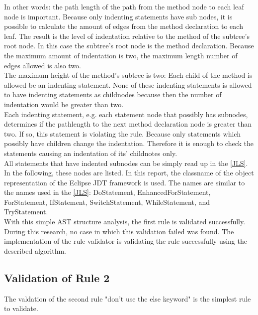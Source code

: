 In other words: the path length of the path from the method node to each leaf node is important. Because only indenting statements have sub nodes, it is possible to calculate the amount of edges from the method declaration to each leaf. The result is the level of indentation relative to the method of the subtree's root node. In this case the subtree's root node is the method declaration. Because the maximum amount of indentation is two, the maximum length number of edges allowed is also two.
\\

The maximum height of the method's subtree is two: Each child of the method is allowed be an indenting statement. None of these indenting statements is allowed to have indenting statements as childnodes because then the number of indentation would be greater than two. 
\\

Each indenting statement, e.g. each statement node that possibly has subnodes, determines if the pathlength to the next method declaration node is greater than two. If so, this statement is violating the rule. Because only statements which possibly have children change the indentation. Therefore it is enough to check the statements causing an indentation of its' childnotes only.
\\

All statements that have indented subnodes can be simply read up in the \ref{JLS}. In the following, these nodes are listed. In this report, the classname of the object representation of the Eclipse \acf{JDT} framework is used. The names are similar to the names used in the \ref{JLS}: DoStatement, EnhancedForStatement, ForStatement, IfStatement, SwitchStatement, WhileStatement, and TryStatement. 
\\

With this simple \acf{AST} structure analysis, the first rule is validated successfully. During this research, no case in which this validation failed was found. The implementation of the rule validator is validating the rule successfully using the described algorithm.

\subsection*{Validation of Rule 2}
\label{evaluation:validationruletwo}
The valdation of the second rule "don’t use the else keyword" is the simplest rule to validate.
\\

